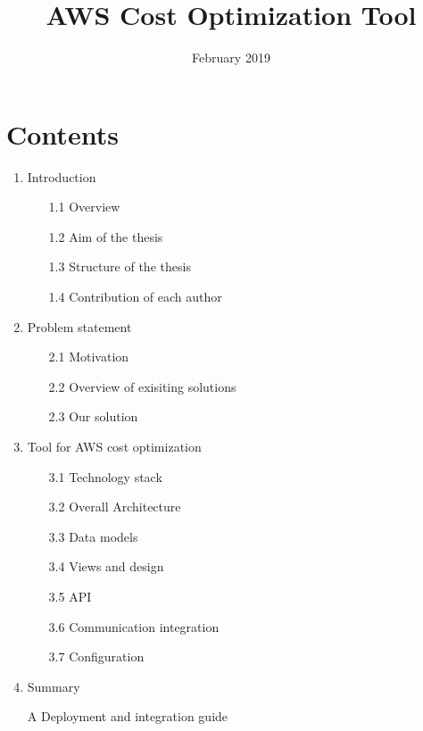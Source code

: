 \documentclass[licencjacka,en]{thesisclass}
\title{AWS Cost Optimization Tool}
\date{February 2019}
\begin{document}
\maketitle

\begin{abstract}
  
\end{abstract}

\chapter*{Contents}

\begin{enumerate}
    \item Introduction
        \begin{enumerate}
            \item [1.1] Overview
            \item [1.2] Aim of the thesis
            \item [1.3] Structure of the thesis
            \item [1.4] Contribution of each author
        \end{enumerate}
    \item Problem statement
        \begin{enumerate}
            \item [2.1] Motivation
            \item [2.2] Overview of exisiting solutions
            \item [2.3] Our solution
        \end{enumerate}
    \item Tool for AWS cost optimization
        \begin{enumerate}
            \item [3.1] Technology stack
            \item [3.2] Overall Architecture
            \item [3.3] Data models
            \item [3.4] Views and design
            \item [3.5] API
            \item [3.6] Communication integration
            \item [3.7] Configuration
        \end{enumerate}
    \item Summary
    \item [A] Deployment and integration guide
\end{enumerate}
\end{document}
